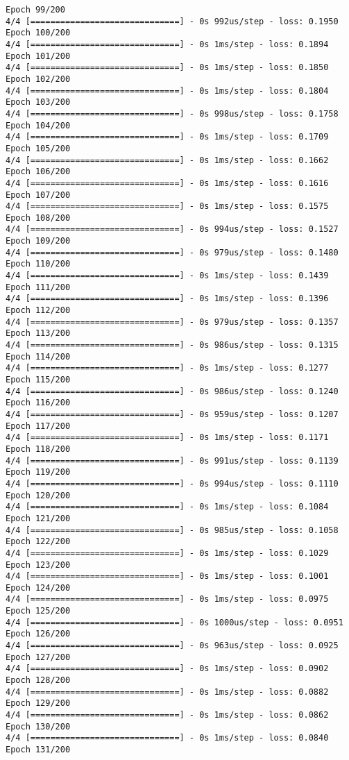 \documentclass[11pt]{article}
\begin{document}
\begin{Verbatim}[commandchars=\\\{\}]
Epoch 99/200
4/4 [==============================] - 0s 992us/step - loss: 0.1950
Epoch 100/200
4/4 [==============================] - 0s 1ms/step - loss: 0.1894
Epoch 101/200
4/4 [==============================] - 0s 1ms/step - loss: 0.1850
Epoch 102/200
4/4 [==============================] - 0s 1ms/step - loss: 0.1804
Epoch 103/200
4/4 [==============================] - 0s 998us/step - loss: 0.1758
Epoch 104/200
4/4 [==============================] - 0s 1ms/step - loss: 0.1709
Epoch 105/200
4/4 [==============================] - 0s 1ms/step - loss: 0.1662
Epoch 106/200
4/4 [==============================] - 0s 1ms/step - loss: 0.1616
Epoch 107/200
4/4 [==============================] - 0s 1ms/step - loss: 0.1575
Epoch 108/200
4/4 [==============================] - 0s 994us/step - loss: 0.1527
Epoch 109/200
4/4 [==============================] - 0s 979us/step - loss: 0.1480
Epoch 110/200
4/4 [==============================] - 0s 1ms/step - loss: 0.1439
Epoch 111/200
4/4 [==============================] - 0s 1ms/step - loss: 0.1396
Epoch 112/200
4/4 [==============================] - 0s 979us/step - loss: 0.1357
Epoch 113/200
4/4 [==============================] - 0s 986us/step - loss: 0.1315
Epoch 114/200
4/4 [==============================] - 0s 1ms/step - loss: 0.1277
Epoch 115/200
4/4 [==============================] - 0s 986us/step - loss: 0.1240
Epoch 116/200
4/4 [==============================] - 0s 959us/step - loss: 0.1207
Epoch 117/200
4/4 [==============================] - 0s 1ms/step - loss: 0.1171
Epoch 118/200
4/4 [==============================] - 0s 991us/step - loss: 0.1139
Epoch 119/200
4/4 [==============================] - 0s 994us/step - loss: 0.1110
Epoch 120/200
4/4 [==============================] - 0s 1ms/step - loss: 0.1084
Epoch 121/200
4/4 [==============================] - 0s 985us/step - loss: 0.1058
Epoch 122/200
4/4 [==============================] - 0s 1ms/step - loss: 0.1029
Epoch 123/200
4/4 [==============================] - 0s 1ms/step - loss: 0.1001
Epoch 124/200
4/4 [==============================] - 0s 1ms/step - loss: 0.0975
Epoch 125/200
4/4 [==============================] - 0s 1000us/step - loss: 0.0951
Epoch 126/200
4/4 [==============================] - 0s 963us/step - loss: 0.0925
Epoch 127/200
4/4 [==============================] - 0s 1ms/step - loss: 0.0902
Epoch 128/200
4/4 [==============================] - 0s 1ms/step - loss: 0.0882
Epoch 129/200
4/4 [==============================] - 0s 1ms/step - loss: 0.0862
Epoch 130/200
4/4 [==============================] - 0s 1ms/step - loss: 0.0840
Epoch 131/200

\end{Verbatim}
\end{document}
